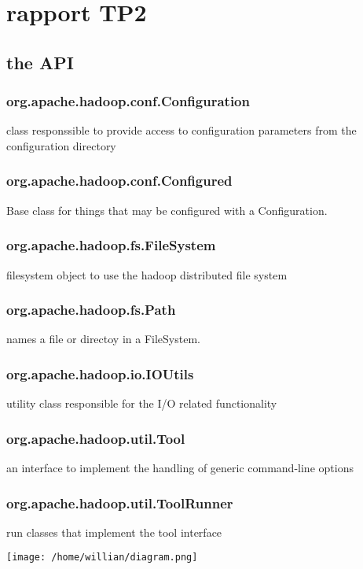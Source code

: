 \documentclass[a4paper]{article}
\author{Willian Ver Valen Paiva}
\date{\today}
\title{}
\begin{document}
\tableofcontents

\section{rapport TP2}
\label{sec:orgheadline14}
\subsection{the API}
\label{sec:orgheadline8}
\subsubsection{org.apache.hadoop.conf.Configuration}
\label{sec:orgheadline1}
class responssible to provide access to configuration parameters from the configuration directory
\subsubsection{org.apache.hadoop.conf.Configured}
\label{sec:orgheadline2}
Base class for things that may be configured with a Configuration.
\subsubsection{org.apache.hadoop.fs.FileSystem}
\label{sec:orgheadline3}
filesystem object to use the hadoop distributed file system
\subsubsection{org.apache.hadoop.fs.Path}
\label{sec:orgheadline4}
names a file or directoy in a FileSystem.
\subsubsection{org.apache.hadoop.io.IOUtils}
\label{sec:orgheadline5}
utility class responsible for the I/O related functionality
\subsubsection{org.apache.hadoop.util.Tool}
\label{sec:orgheadline6}
an interface to implement the handling of generic command-line options
\subsubsection{org.apache.hadoop.util.ToolRunner}
\label{sec:orgheadline7}
run classes that implement the tool interface

\texttt{[image: /home/willian/diagram.png]}
\end{document}
